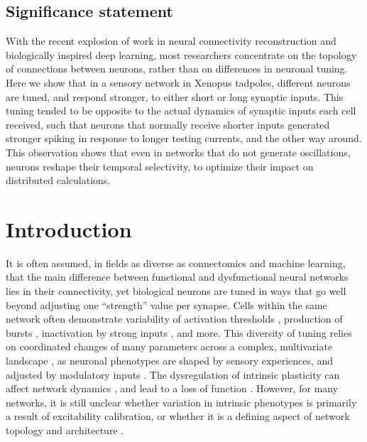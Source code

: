 \documentclass{article}
\begin{document}
\begin{flushleft}
\section*{Significance statement}
With the recent explosion of work in neural connectivity reconstruction and biologically inspired deep learning, most researchers concentrate on the topology of connections between neurons, rather than on differences in neuronal tuning. Here we show that in a sensory network in Xenopus tadpoles, different neurons are tuned, and respond stronger, to either short or long synaptic inputs. This tuning tended to be opposite to the actual dynamics of synaptic inputs each cell received, such that neurons that normally receive shorter inputs generated stronger spiking in response to longer testing currents, and the other way around. This observation shows that even in networks that do not generate oscillations, neurons reshape their temporal selectivity, to optimize their impact on distributed calculations. 
\bigskip

\end{flushleft} %

\section*{Introduction}


It is often assumed, in fields as diverse as connectomics and machine learning, that the main difference between functional and dysfunctional neural networks lies in their connectivity, yet biological neurons are tuned in ways that go well beyond adjusting one “strength” value per synapse. Cells within the same network often demonstrate variability of activation thresholds \citep{kole2012}, production of bursts \citep{popovic2011}, inactivation by strong inputs \citep{bianchi2012}, and more. This diversity of tuning relies on coordinated changes of many parameters across a complex, multivariate landscape \citep{oleary2013}, as neuronal phenotypes are shaped by sensory experiences, and adjusted by modulatory inputs \citep{evans2015}. The dysregulation of intrinsic plasticity can affect network dynamics \citep{tien2018}, and lead to a loss of function \citep{marcelin2009}. However, for many networks, it is still unclear whether variation in intrinsic phenotypes is primarily a result of excitability calibration, or whether it is a defining aspect of network topology and architecture \citep{titley2017}.
\end{document}

